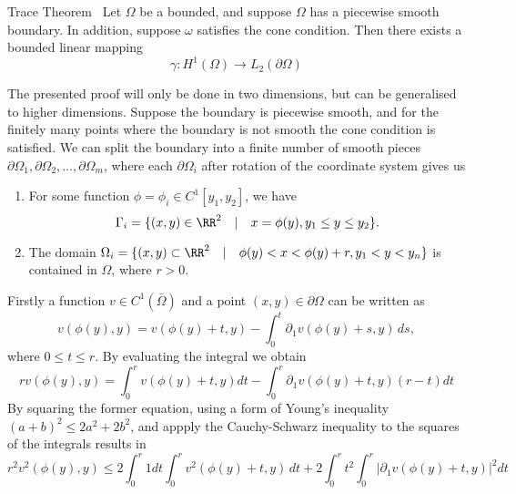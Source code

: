 
\begin{thmx}{Trace Theorem}~\label{thm:trace}
    Let $\Omega$ be a bounded, and suppose $\Omega$ has a piecewise smooth boundary. In addition, suppose $\omega$ satisfies the cone condition. Then there exists a bounded linear mapping
    \begin{equation*}
        \gamma : H^1(\Omega) \to L_2(\partial \Omega)
    \end{equation*}
\end{thmx}
\begin{bev}
    The presented proof will only be done in two dimensions, but can be generalised to higher dimensions.
    Suppose the boundary is piecewise smooth, and for the finitely many points where the boundary is not smooth the cone condition is satisfied. We can split the boundary into a finite number of smooth pieces $\partial \Omega_1, \partial \Omega_2, \dots, \partial \Omega_m$, where each $\partial \Omega_i$ after rotation of the coordinate system gives us
    \begin{enumerate}
        \item For some function $\phi = \phi_i \in C^1[y_1, y_2]$, we have
            \[ \Gamma_i = \{ (x,y) \in \RR^2 \quad | \quad x = \phi(y), y_1 \leq y \leq y_2 \}. \]
        \item The domain $\Omega_i = \{ (x,y) \subset \RR^2 \quad | \quad \phi(y) < x <\phi(y) + r, y_1 < y < y_n \}$ is contained in $\Omega$, where $r > 0$.
    \end{enumerate}
    Firstly a function $v \in C^1(\bar{\Omega})$ and a point $(x,y) \in \partial \Omega$ can be written as
    \begin{equation}
        v(\phi(y), y) = v(\phi(y) + t, y) - \int_0^t \partial_1 v(\phi(y) + s, y) \, ds,
    \end{equation}
    where $0 \leq t \leq r$. By evaluating the integral we obtain
    \begin{equation}
        r v(\phi(y), y) = \int_0^r v(\phi(y) + t, y) dt - \int_0^r \partial_1 v(\phi(y) + t, y)(r-t) dt
    \end{equation}
    By squaring the former equation, using a form of Young's inequality ${(a+b)}^2 \leq 2a^2 + 2b^2$, and appply the Cauchy-Schwarz inequality to the squares of the integrals results in
    \begin{equation}
        r^2 v^2(\phi(y), y) \leq 2 \int_0^r 1 dt \int_0^r v^2(\phi(y) + t, y) \, dt +  2\int_0^r t^2 \int_0^r | \partial_1  v(\phi(y) + t, y) |^2 dt

\end{equation}
\end{bev}
